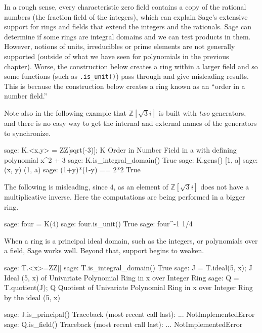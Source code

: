 %
In a rough sense, every characteristic zero field contains a copy of the rational numbers (the fraction field of the integers), which can explain Sage's extensive support for rings and fields that extend the integers and the rationals.
%
%
Sage can determine if some rings are integral domains and we can test products in them.  However, notions of units, irreducibles or prime elements are not generally supported (outside of what we have seen for polynomials in the previous chapter).  Worse, the construction below creates a ring within a larger field and so some functions (such as \verb?.is_unit()?) pass through and give misleading results.  This is because the construction below creates a ring known as an ``order in a number field.''\par
%
Note also in the following example that ${\mathbb Z}[\sqrt{3}i]$ is built with \emph{two} generators, and there is no easy way to get the internal and external names of the generators to synchronize.
%
\begin{sageexample}
sage: K.<x,y> = ZZ[sqrt(-3)]; K
Order in Number Field in a with defining polynomial x^2 + 3
sage: K.is_integral_domain()
True
sage: K.gens()
[1, a]
sage: (x, y)
(1, a)
sage: (1+y)*(1-y) == 2*2
True
\end{sageexample}
%
The following is misleading, since $4$, as an element of ${\mathbb Z}[\sqrt{3}i]$ does not have a multiplicative inverse.  Here the computations are being performed in a bigger ring.
%
\begin{sageexample}
sage: four = K(4)
sage: four.is_unit()
True
sage: four^-1
1/4
\end{sageexample}
%
%
When a ring is a principal ideal domain, such as the integers, or polynomials over a field, Sage works well.  Beyond that, support begins to weaken.
%
\begin{sageexample}
sage: T.<x>=ZZ[]
sage: T.is_integral_domain()
True
sage: J = T.ideal(5, x); J
Ideal (5, x) of Univariate Polynomial Ring in x over Integer Ring
sage: Q = T.quotient(J); Q
Quotient of Univariate Polynomial Ring in x over
Integer Ring by the ideal (5, x)
\end{sageexample}
%
\begin{sageexample}
sage: J.is_principal()
Traceback (most recent call last):
...
NotImplementedError
sage: Q.is_field()
Traceback (most recent call last):
...
NotImplementedError
\end{sageexample}
%







